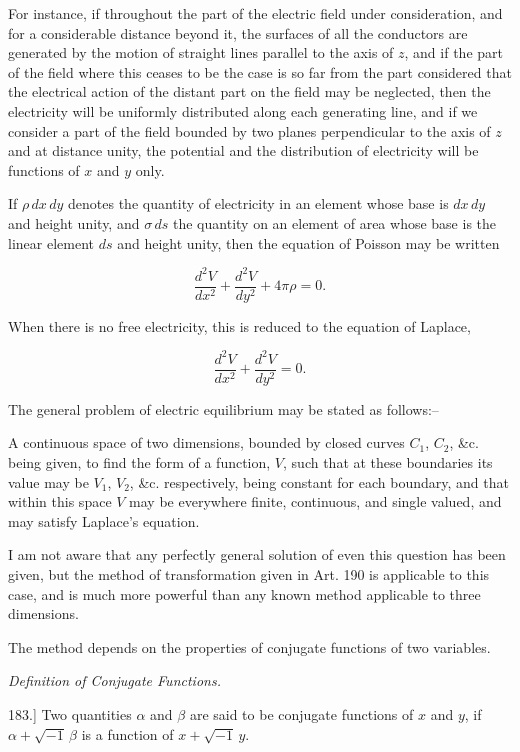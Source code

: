 \documentclass[11pt,a4paper]{article}
\begin{document}
For instance, if throughout the part of the electric field under consideration, and for a considerable distance beyond it, the surfaces of all the conductors are generated by the motion of straight lines parallel to the axis of $z$, and if the part of the field where this ceases to be the case is so far from the part considered that the electrical action of the distant part on the field may be neglected, then the electricity will be uniformly distributed along each generating line, and if we consider a part of the field bounded by two planes perpendicular to the axis of $z$ and at distance unity, the potential and the distribution of electricity will be functions of $x$ and $y$ only.

If $\rho\,dx\,dy$ denotes the quantity of electricity in an element whose base is $dx\,dy$ and height unity, and $\sigma\,ds$ the quantity on an element of area whose base is the linear element $ds$ and height unity, then the equation of Poisson may be written

\[
\frac{d^2V}{dx^2} + \frac{d^2V}{dy^2} + 4\pi\rho = 0.
\]

When there is no free electricity, this is reduced to the equation of Laplace,

\[
\frac{d^2V}{dx^2}+\frac{d^2V}{dy^2}=0.
\]

The general problem of electric equilibrium may be stated as follows:--

A continuous space of two dimensions, bounded by closed curves $C_1$, $C_2$, \&c. being given, to find the form of a function, $V$, such that at these boundaries its value may be $V_1$, $V_2$, \&c. respectively, being constant for each boundary, and that within this space $V$ may be everywhere finite, continuous, and single valued, and may satisfy Laplace's equation.

I am not aware that any perfectly general solution of even this question has been given, but the method of transformation given in Art. 190 is applicable to this case, and is much more powerful than any known method applicable to three dimensions.

The method depends on the properties of conjugate functions of two variables.

\begin{center}
\textit{Definition of Conjugate Functions.}
\end{center}

183.] Two quantities $\alpha$ and $\beta$ are said to be conjugate functions of $x$ and $y$, if $\alpha+\sqrt{-1}\,\beta$ is a function of $x+\sqrt{-1}\,y$.
\end{document}
